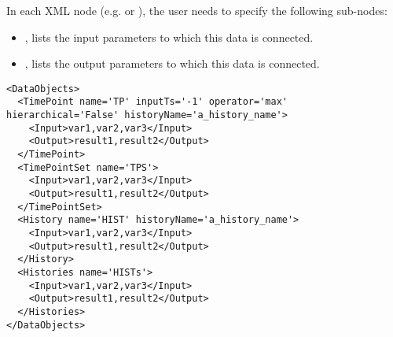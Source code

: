 \vspace{-5mm}
In each XML node (e.g.  or ), the user
needs to specify the following sub-nodes:
\begin{itemize}
  \item {},  lists
  the input parameters to which this data is connected.
  \item {},  lists
  the output parameters to which this data is connected.
\end{itemize}

\begin{lstlisting}[style=XML,morekeywords={inputTs,operator,hierarchical,name,history}]
<DataObjects>
  <TimePoint name='TP' inputTs='-1' operator='max' hierarchical='False' historyName='a_history_name'>
    <Input>var1,var2,var3</Input>
    <Output>result1,result2</Output>
  </TimePoint>
  <TimePointSet name='TPS'>
    <Input>var1,var2,var3</Input>
    <Output>result1,result2</Output>
  </TimePointSet>
  <History name='HIST' historyName='a_history_name'>
    <Input>var1,var2,var3</Input>
    <Output>result1,result2</Output>
  </History>
  <Histories name='HISTs'>
    <Input>var1,var2,var3</Input>
    <Output>result1,result2</Output>
  </Histories>
</DataObjects>
\end{lstlisting}

